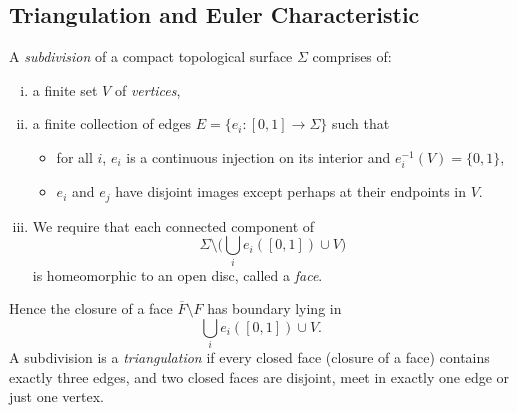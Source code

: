 \documentclass[12pt]{article}
\begin{document}
\begin{figure}[h]
	\centering
	\caption{Squishing down $\mathbb{RP}^2$}
	\label{fig:squish_rp2}
	\begin{subfigure}{.5\textwidth}
		\centering
	\end{subfigure}%
	\begin{subfigure}{.5\textwidth}
		\centering
	\end{subfigure}
\end{figure}

\subsection{Triangulation and Euler Characteristic}
\label{sub:triangulation_and_euler_characteristic}

\begin{definition}
	A \emph{subdivision} of a compact topological surface $\Sigma$ comprises of:
	\begin{enumerate}[(i)]
		\item a finite set $V$ of \emph{vertices},
		\item a finite collection of edges $E = \{e_i : [0,1] \to \Sigma\}$ such that
			\begin{itemize}
				\item for all $i$, $e_i$ is a continuous injection on its interior and $e_i^{-1}(V) = \{0, 1\}$,
				\item $e_i$ and $e_j$ have disjoint images except perhaps at their endpoints in $V$.
			\end{itemize}
		\item We require that each connected component of
			\[
				\Sigma \setminus \Biggl( \bigcup_{i} e_i ([0,1]) \cup V \Biggr)
			\]
			is homeomorphic to an open disc, called a \emph{face}.
	\end{enumerate}
	Hence the closure of a face $\overline{F} \setminus F$ has boundary lying in
	\[
		\bigcup_{i} e_i ([0,1]) \cup V
	.\]
	A subdivision is a \emph{triangulation} if every closed face (closure of a face) contains exactly three edges, and two closed faces are disjoint, meet in exactly one edge or just one vertex.
\end{definition}
\end{document}
